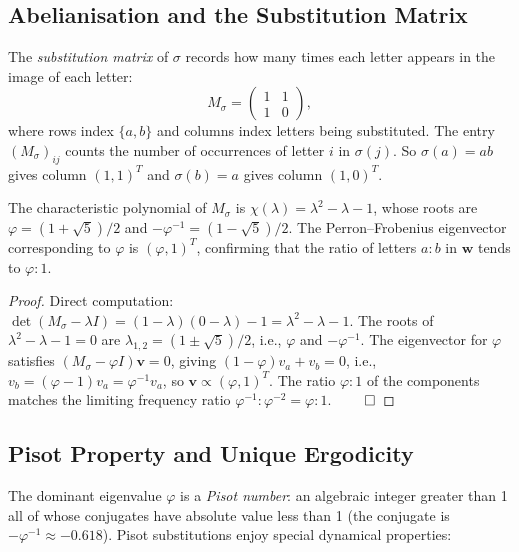 \subsection{Abelianisation and the Substitution Matrix}
\label{subsec:ch19-abel}

The \emph{substitution matrix} of \(\sigma\) records how many times
each letter appears in the image of each letter:
\[
  M_\sigma = \begin{pmatrix} 1 & 1 \\ 1 & 0 \end{pmatrix},
\]
where rows index \(\{a,b\}\) and columns index letters being
substituted.  The entry \((M_\sigma)_{ij}\) counts the number of
occurrences of letter \(i\) in \(\sigma(j)\).
So \(\sigma(a)=ab\) gives column \((1,1)^T\) and
\(\sigma(b)=a\) gives column \((1,0)^T\).

\begin{proposition}%
  \label{prop:eigenvalue}
  The characteristic polynomial of \(M_\sigma\) is
  \(\chi(\lambda) = \lambda^2 - \lambda - 1\), whose roots are
  \(\varphi=(1+\sqrt{5})/2\) and \(-\varphi^{-1}=(1-\sqrt{5})/2\).
  The Perron--Frobenius eigenvector corresponding to \(\varphi\) is
  \(({\varphi},{1})^T\), confirming that the ratio of letters
  \(a:b\) in \(\mathbf{w}\) tends to \(\varphi:1\).
\end{proposition}
\begin{proof}
  Direct computation:
  \(\det(M_\sigma-\lambda I)=(1-\lambda)(0-\lambda)-1=\lambda^2-\lambda-1\).
  The roots of \(\lambda^2-\lambda-1=0\) are
  \(\lambda_{1,2}=(1\pm\sqrt{5})/2\), i.e., \(\varphi\) and
  \(-\varphi^{-1}\).  The eigenvector for \(\varphi\) satisfies
  \((M_\sigma-\varphi I)\mathbf{v}=0\), giving
  \((1-\varphi)v_a+v_b=0\), i.e., \(v_b=({\varphi}-1)v_a=\varphi^{-1}v_a\),
  so \(\mathbf{v}\propto(\varphi,1)^T\).
  The ratio \(\varphi:1\) of the components matches the limiting
  frequency ratio \(\varphi^{-1}:\varphi^{-2}=\varphi:1\). \(\qed\)
\end{proof}

\subsection{Pisot Property and Unique Ergodicity}
\label{subsec:ch19-pisot}

The dominant eigenvalue \(\varphi\) is a \emph{Pisot number}: an
algebraic integer greater than 1 all of whose conjugates have
absolute value less than 1 (the conjugate is \(-\varphi^{-1}\approx-0.618\)).
Pisot substitutions enjoy special dynamical properties:

